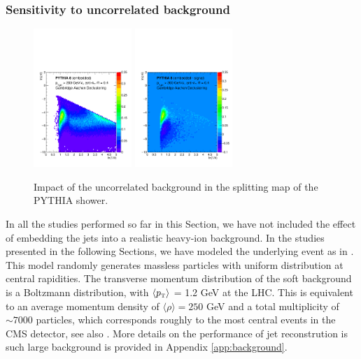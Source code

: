 \subsubsection{Sensitivity to uncorrelated background}
\label{sec:uncorrelatedbackground}

\begin{figure}[th]
\centering
\includegraphics[width=0.33\textwidth]
{figures/LundMC/FinalPlots/PythiaEmb_CA.pdf}%
\includegraphics[width=0.33\textwidth]
{figures/LundMC/FinalPlots/PythiaDiff_CA.pdf}%
\caption{Impact of the uncorrelated background in the splitting map of the PYTHIA shower.}
\label{fig:UncorrelatedBkg}
\end{figure}

In all the studies performed so far in this Section, we have not included the effect of embedding the jets into a realistic heavy-ion background. In the studies presented in the following Sections, we have modeled the underlying event as in \cite{deBarros:2012ws}. 
This model randomly generates massless particles with uniform distribution at central rapidities. The transverse momentum distribution of the soft background is a Boltzmann distribution, with $\langle p_{\text{\tiny T}} \rangle$ = 1.2 GeV at the LHC. This is equivalent to an average momentum density of $\langle \rho \rangle =250$ GeV and a total multiplicity of $\sim 7000$ particles, which corresponds roughly to the most central events in the CMS detector, see also \cite{cerninstitute-twiki}. More details on the performance of jet reconstrution is such large background is provided in Appendix \ref{app:background}.

